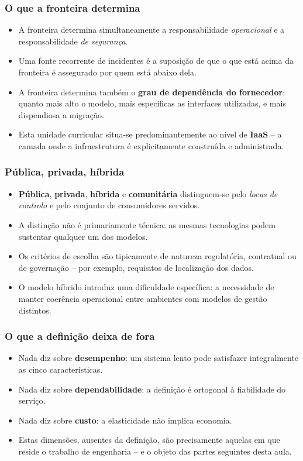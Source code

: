 \documentclass[aspectratio=169]{beamer}
\begin{document}
\begin{frame}
\frametitle{O que a fronteira determina}
\begin{itemize}
    \setlength\itemsep{0.35cm}
    \item A fronteira determina simultaneamente a responsabilidade \emph{operacional} e a responsabilidade \emph{de segurança}.
    \item Uma fonte recorrente de incidentes é a suposição de que o que está acima da fronteira é assegurado por quem está abaixo dela.
    \item A fronteira determina também o \textbf{grau de dependência do fornecedor}: quanto mais alto o modelo, mais específicas as interfaces utilizadas, e mais dispendiosa a migração.
    \item Esta unidade curricular situa-se predominantemente ao nível de \textbf{IaaS} -- a camada onde a infraestrutura é explicitamente construída e administrada.
\end{itemize}
\end{frame}

\begin{frame}
\frametitle{Pública, privada, híbrida}
\begin{itemize}
    \setlength\itemsep{0.35cm}
    \item \textbf{Pública}, \textbf{privada}, \textbf{híbrida} e \textbf{comunitária} distinguem-se pelo \emph{locus de controlo} e pelo conjunto de consumidores servidos.
    \item A distinção não é primariamente técnica: as mesmas tecnologias podem sustentar qualquer um dos modelos.
    \item Os critérios de escolha são tipicamente de natureza regulatória, contratual ou de governação -- por exemplo, requisitos de localização dos dados.
    \item O modelo híbrido introduz uma dificuldade específica: a necessidade de manter coerência operacional entre ambientes com modelos de gestão distintos.
\end{itemize}
\end{frame}

\begin{frame}
\frametitle{O que a definição deixa de fora}
\begin{itemize}
    \setlength\itemsep{0.35cm}
    \item Nada diz sobre \textbf{desempenho}: um sistema lento pode satisfazer integralmente as cinco características.
    \item Nada diz sobre \textbf{dependabilidade}: a definição é ortogonal à fiabilidade do serviço.
    \item Nada diz sobre \textbf{custo}: a elasticidade não implica economia.
    \item Estas dimensões, ausentes da definição, são precisamente aquelas em que reside o trabalho de engenharia -- e o objeto das partes seguintes desta aula.
\end{itemize}
\end{frame}
\end{document}
